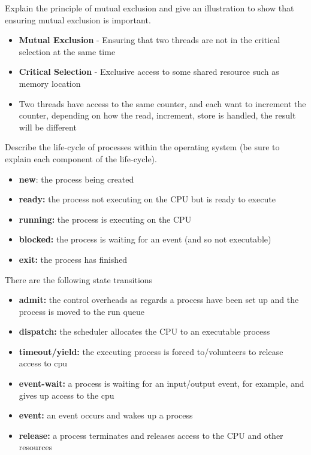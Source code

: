 \documentclass[addpoints]{exam}
\begin{document}
\begin{questions}
\question[6]Explain the principle of mutual exclusion and give an illustration to show that ensuring mutual exclusion is important.
\begin{solution}[2in]
	\begin{itemize}
		\item \textbf{Mutual Exclusion} - Ensuring that two threads are not in the critical selection at the same time
		\item \textbf{Critical Selection} - Exclusive access to some shared resource such as memory location
		\item  Two threads have access to the same counter, and each want to increment the counter, depending on how the read, increment, store is handled, the result will be different
	\end{itemize}
\end{solution}

\question[10]Describe the life-cycle of processes within the operating system (be sure to explain each component of the life-cycle).
\begin{solution}[2in]
	\begin{itemize}
		\item \textbf{new}: the process being created
		\item \textbf{ready:} the process not executing on the CPU but is ready to execute
		\item \textbf{running:} the process is executing on the CPU
		\item \textbf{blocked:} the process is waiting for an event (and so not executable)
		\item \textbf{exit:} the process has finished
	\end{itemize}
	There are the following state transitions
	\begin{itemize}
		\item \textbf{admit:} the control overheads as regards a process have been set up and the process is moved to the run queue
		\item \textbf{dispatch:} the scheduler allocates the CPU to an executable process
		\item \textbf{timeout/yield:} the executing process is forced to/volunteers to release access to cpu
		\item \textbf{event-wait:} a process is waiting for an input/output event, for example, and gives up access to the cpu
		\item \textbf{event:} an event occurs and wakes up a process
		\item \textbf{release:} a process terminates and releases access to the CPU and other resources
	\end{itemize}
\end{solution}


\end{questions}
\end{document}

